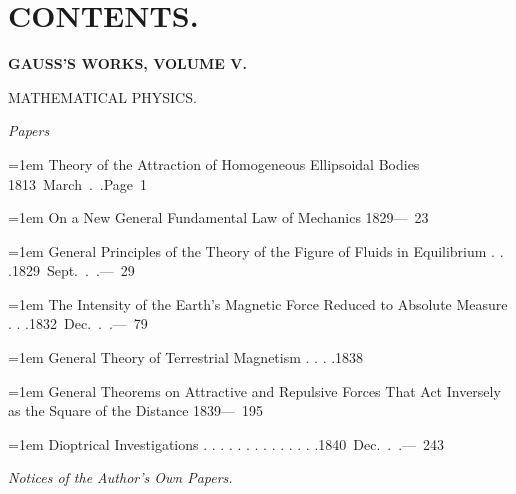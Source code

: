 \section*{CONTENTS.}
\begin{center}\bfseries GAUSS’S WORKS, VOLUME V.\par MATHEMATICAL PHYSICS.\end{center}
\par\nopagebreak[4]\smallskip\noindent\makebox[\linewidth][c]{\rule{.075\linewidth}{.35pt}}\par
\begingroup\fontsize{9}{11}\selectfont\raggedright
\par{}\medskip\noindent\textit{Papers}\par\smallskip
\noindent\hangindent=1em Theory of the Attraction of Homogeneous Ellipsoidal Bodies \unskip\hspace{1em plus 1fill}\mbox{1813 March . .\quad Page 1}\par\smallskip
\noindent\hangindent=1em On a New General Fundamental Law of Mechanics \unskip\hspace{1em plus 1fill}\mbox{1829\quad — 23}\par\smallskip
\noindent\hangindent=1em General Principles of the Theory of the Figure of Fluids in Equilibrium . . .\unskip\hspace{1em plus 1fill}\mbox{1829 Sept. . .\quad — 29}\par\smallskip
\noindent\hangindent=1em The Intensity of the Earth’s Magnetic Force Reduced to Absolute Measure . . .\unskip\hspace{1em plus 1fill}\mbox{1832 Dec. . .\quad — 79}\par\smallskip
\noindent\hangindent=1em General Theory of Terrestrial Magnetism . . . .\unskip\hspace{1em plus 1fill}\mbox{1838}\par\smallskip
\noindent\hangindent=1em General Theorems on Attractive and Repulsive Forces That Act Inversely as the Square of the Distance \unskip\hspace{1em plus 1fill}\mbox{1839\quad — 195}\par\smallskip
\noindent\hangindent=1em Dioptrical Investigations . . . . . . . . . . . . . .\unskip\hspace{1em plus 1fill}\mbox{1840 Dec. . .\quad — 243}\par\smallskip
\par{}\medskip\noindent\textit{Notices of the Author’s Own Papers.}\par\smallskip
